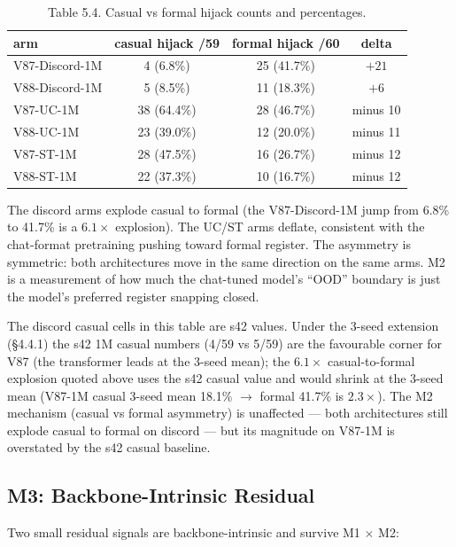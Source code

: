 \documentclass[11pt]{article}
\begin{document}
\begin{table}[!t]
\centering
\small
\caption*{Table 5.4. Casual vs formal hijack counts and percentages.}
\begin{tabular}{lccc}
\toprule
arm & casual hijack /59 & formal hijack /60 & delta \\
\midrule
V87-Discord-1M & 4 (6.8\%) & 25 (41.7\%) & $+21$ \\
V88-Discord-1M & 5 (8.5\%) & 11 (18.3\%) & $+6$ \\
V87-UC-1M & 38 (64.4\%) & 28 (46.7\%) & minus 10 \\
V88-UC-1M & 23 (39.0\%) & 12 (20.0\%) & minus 11 \\
V87-ST-1M & 28 (47.5\%) & 16 (26.7\%) & minus 12 \\
V88-ST-1M & 22 (37.3\%) & 10 (16.7\%) & minus 12 \\
\bottomrule
\end{tabular}
\end{table}

The discord arms explode casual to formal (the V87-Discord-1M jump from 6.8\% to 41.7\% is a $6.1\times$ explosion). The UC/ST arms deflate, consistent with the chat-format pretraining pushing toward formal register. The asymmetry is symmetric: both architectures move in the same direction on the same arms. M2 is a measurement of how much the chat-tuned model's ``OOD'' boundary is just the model's preferred register snapping closed.

The discord casual cells in this table are s42 values. Under the 3-seed extension (\S4.4.1) the s42 1M casual numbers (4/59 vs 5/59) are the favourable corner for V87 (the transformer leads at the 3-seed mean); the $6.1\times$ casual-to-formal explosion quoted above uses the s42 casual value and would shrink at the 3-seed mean (V87-1M casual 3-seed mean 18.1\% $\to$ formal 41.7\% is $2.3\times$). The M2 mechanism (casual vs formal asymmetry) is unaffected --- both architectures still explode casual to formal on discord --- but its magnitude on V87-1M is overstated by the s42 casual baseline.

\subsection{M3: Backbone-Intrinsic Residual}

Two small residual signals are backbone-intrinsic and survive M1 $\times$ M2:
\end{document}
